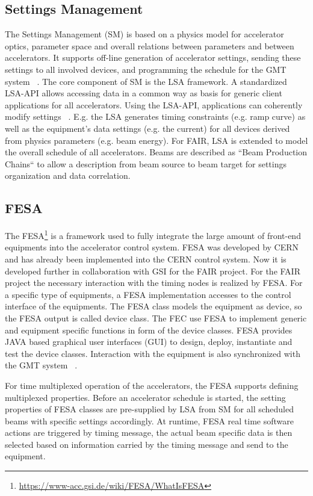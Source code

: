 \subsection{Settings Management}
The Settings Management (\gls{SM}) is based on a physics model for accelerator optics, parameter space and overall relations between parameters and between accelerators. It supports off-line generation of accelerator settings, sending these settings to all involved devices, and programming the schedule for the GMT system ~\cite{huhmann_fair_2013}. The core component of SM is the LSA framework. A standardized  LSA-\gls{API} allows accessing data in a common way as basis for generic client applications for all accelerators. Using the LSA-API, applications can coherently modify settings ~\cite{huhmann_fair_2013}. E.g. the LSA generates timing constraints (e.g. ramp curve) as well as the equipment's data settings (e.g. the current) for all devices derived from physics parameters (e.g. beam energy). For FAIR, LSA is extended to model the overall schedule of all accelerators. Beams are described as ``Beam Production Chains`` to allow a description from beam source to beam target for settings organization and data correlation.


\subsection{FESA}
The \gls{FESA}\footnote{\url{https://www-acc.gsi.de/wiki/FESA/WhatIsFESA}} is a framework used to fully integrate the large amount of front-end equipments into the accelerator control system. FESA was developed by CERN and has already been implemented into the \gls{CERN} control system. Now it is developed further in collaboration with GSI for the FAIR project. For the FAIR project the necessary interaction with the timing nodes is realized by FESA. For a specific type of equipments, a FESA implementation accesses to the control interface of the equipments. The FESA class models the equipment as device, so the FESA output is called device class. The \gls{FEC} use FESA to implement generic and equipment specific functions in form of the device classes. FESA provides JAVA based graphical user interfaces (GUI) to design, deploy, instantiate and test the device classes. Interaction with the equipment is also synchronized with the GMT system ~\cite{hoffmann_fesafront-end_2008}. 

For time multiplexed operation of the accelerators, the FESA supports defining multiplexed properties. Before an accelerator schedule is started, the setting properties of FESA classes are pre-supplied by LSA from SM for all scheduled beams with specific settings accordingly. At runtime, FESA real time software actions are triggered by timing message, the actual beam specific data is then selected based on information carried by the timing message and send to the equipment. 

